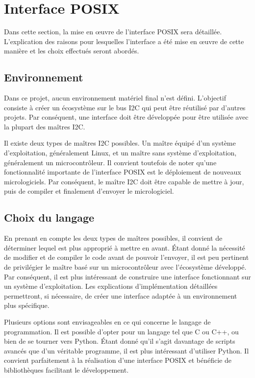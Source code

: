 \section{Interface POSIX}

Dans cette section, la mise en \oe{}uvre de l'interface POSIX sera détaillée. L'explication des raisons pour lesquelles l'interface a été mise en \oe{}uvre de cette manière et les choix effectués seront abordés.

\subsection{Environnement}

Dans ce projet, aucun environnement matériel final n'est défini. L'objectif consiste à créer un écosystème sur le bus I2C qui peut être réutilisé par d'autres projets. Par conséquent, une interface doit être développée pour être utilisée avec la plupart des maîtres I2C.

Il existe deux types de maîtres I2C possibles. Un maître équipé d'un système d'exploitation, généralement Linux, et un maître sans système d'exploitation, généralement un microcontrôleur. Il convient toutefois de noter qu'une fonctionnalité importante de l'interface POSIX est le déploiement de nouveaux micrologiciels. Par conséquent, le maître I2C doit être capable de mettre à jour, puis de compiler et finalement d'envoyer le micrologiciel.

\subsection{Choix du langage}

En prenant en compte les deux types de maîtres possibles, il convient de déterminer lequel est plus approprié à mettre en avant.
Étant donné la nécessité de modifier et de compiler le code avant de pouvoir l'envoyer, il est peu pertinent de privilégier le maître basé sur un microcontrôleur avec l'écosystème développé.
Par conséquent, il est plus intéressant de construire une interface fonctionnant sur un système d'exploitation. Les explications d'implémentation détaillées permettront, si nécessaire, de créer une interface adaptée à un environnement plus spécifique.

Plusieurs options sont envisageables en ce qui concerne le langage de programmation.
Il est possible d'opter pour un langage tel que C ou C++, ou bien de se tourner vers Python.
Étant donné qu'il s'agit davantage de scripts avancés que d'un véritable programme, il est plus intéressant d'utiliser Python.
Il convient parfaitement à la réalisation d'une interface POSIX et bénéficie de bibliothèques facilitant le développement.

